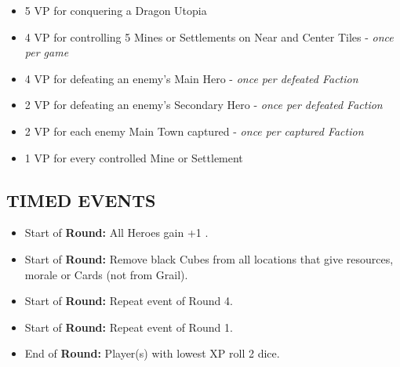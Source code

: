 \begin{multicols*}{2}
\begin{itemize}
 \item 5 VP for conquering a Dragon Utopia
 \item 4 VP for controlling 5 Mines or Settlements on Near and Center Tiles - \textit{once per game}
 \item 4 VP for defeating an enemy's Main Hero - \textit{once per defeated Faction}
 \item 2 VP for defeating an enemy's Secondary Hero - \textit{once per defeated Faction}
 \item 2 VP for each enemy Main Town captured - \textit{once per captured Faction}
 \item 1 VP for every controlled Mine or Settlement
\end{itemize}

\subsection*{\MakeUppercase{Timed Events}}

\begin{itemize}
  \item Start of \textbf{ Round:} All Heroes gain +1 .
  \item Start of \textbf{ Round:} Remove black Cubes from all locations that give resources, morale or Cards (not from Grail).
  \item Start of \textbf{ Round:} Repeat event of Round 4.
  \item Start of \textbf{ Round:} Repeat event of Round 1.
  \item End of \textbf{ Round:} Player(s) with lowest XP roll 2  dice.
\end{itemize}


\end{multicols*}
